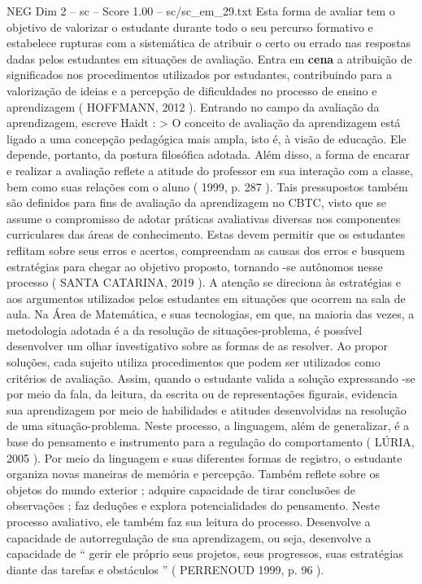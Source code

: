\begin{textsample}{NEG Dim 2 – sc – Score 1.00 – sc/sc\_em\_29.txt}
Esta forma de avaliar tem o objetivo de valorizar o estudante durante todo o seu percurso formativo e estabelece rupturas com a sistemática de atribuir o certo ou errado nas respostas dadas pelos estudantes em situações de avaliação.
Entra em \textbf{cena} a atribuição de significados nos procedimentos utilizados por estudantes, contribuindo para a valorização de ideias e a percepção de dificuldades no processo de ensino e aprendizagem ( HOFFMANN, 2012 ).
Entrando no campo da avaliação da aprendizagem, escreve Haidt : > O conceito de avaliação da aprendizagem está ligado a uma concepção pedagógica mais ampla, isto é, à visão de educação.
Ele depende, portanto, da postura filosófica adotada.
Além disso, a forma de encarar e realizar a avaliação reflete a atitude do professor em sua interação com a classe, bem como suas relações com o aluno ( 1999, p. 287 ).
Tais pressupostos também são definidos para fins de avaliação da aprendizagem no CBTC, visto que se assume o compromisso de adotar práticas avaliativas diversas nos componentes curriculares das áreas de conhecimento.
Estas devem permitir que os estudantes reflitam sobre seus erros e acertos, compreendam as causas dos erros e busquem estratégias para chegar ao objetivo proposto, tornando -se autônomos nesse processo ( SANTA CATARINA, 2019 ).
A atenção se direciona às estratégias e aos argumentos utilizados pelos estudantes em situações que ocorrem na sala de aula.
Na Área de Matemática, e suas tecnologias, em que, na maioria das vezes, a metodologia adotada é a da resolução de situações-problema, é possível desenvolver um olhar investigativo sobre as formas de as resolver.
Ao propor soluções, cada sujeito utiliza procedimentos que podem ser utilizados como critérios de avaliação.
Assim, quando o estudante valida a solução expressando -se por meio da fala, da leitura, da escrita ou de representações figurais, evidencia sua aprendizagem por meio de habilidades e atitudes desenvolvidas na resolução de uma situação-problema.
Neste processo, a linguagem, além de generalizar, é a base do pensamento e instrumento para a regulação do comportamento ( LÚRIA, 2005 ).
Por meio da linguagem e suas diferentes formas de registro, o estudante organiza novas maneiras de memória e percepção.
Também reflete sobre os objetos do mundo exterior ; adquire capacidade de tirar conclusões de observações ; faz deduções e explora potencialidades do pensamento.
Neste processo avaliativo, ele também faz sua leitura do processo.
Desenvolve a capacidade de autorregulação de sua aprendizagem, ou seja, desenvolve a capacidade de “ gerir ele próprio seus projetos, seus progressos, suas estratégias diante das tarefas e obstáculos ” ( PERRENOUD 1999, p. 96 ).

\end{textsample}
